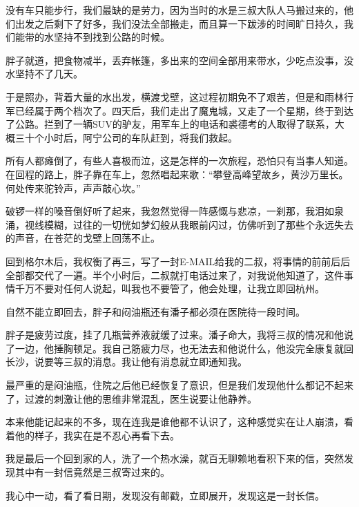 没有车只能步行，我们最缺的是劳力，因为当时的水是三叔大队人马搬过来的，他们出发之后剩下了好多，我们没法全部搬走，而且算一下跋涉的时间旷日持久，我们能带的水坚持不到找到公路的时候。

胖子就道，把食物减半，丢弃帐篷，多出来的空间全部用来带水，少吃点没事，没水坚持不了几天。

于是照办，背着大量的水出发，横渡戈壁，这过程初期免不了艰苦，但是和雨林行军已经属于两个档次了。四天后，我们走出了魔鬼城，又走了一个星期，终于到达了公路。拦到了一辆SUV的驴友，用军车上的电话和裘德考的人取得了联系，大概三十个小时后，阿宁公司的车队赶到，将我们救起。

所有人都瘫倒了，有些人喜极而泣，这是怎样的一次旅程，恐怕只有当事人知道。在回程的路上，胖子靠在车上，忽然唱起来歌：“攀登高峰望故乡，黄沙万里长。何处传来驼铃声，声声敲心坎。”

破锣一样的嗓音倒好听了起来，我忽然觉得一阵感慨与悲凉，一刹那，我泪如泉涌，视线模糊，过往的一切恍如梦幻般从我眼前闪过，仿佛听到了那些个永远失去的声音，在苍茫的戈壁上回荡不止。

回到格尔木后，我权衡了再三，写了一封E-MAIL给我的二叔，将事情的前前后后全部都交代了一遍。半个小时后，二叔就打电话过来了，对我说他知道了，这件事情千万不要对任何人说起，叫我也不要管了，他会处理，让我立即回杭州。

自然不能立即回去，胖子和闷油瓶还有潘子都必须在医院待一段时间。

胖子是疲劳过度，挂了几瓶营养液就缓了过来。潘子命大，我将三叔的情况和他说了一边，他捶胸顿足。我自己筋疲力尽，也无法去和他说什么，他没完全康复就回长沙，说要等三叔的消息。我让他有消息就立即通知我。

最严重的是闷油瓶，住院之后他已经恢复了意识，但是我们发现他什么都记不起来了，过渡的刺激让他的思维非常混乱，医生说要让他静养。

本来他能记起来的不多，现在连我是谁他都不认识了，这种感觉实在让人崩溃，看着他的样子，我实在是不忍心再看下去。

我是最后一个回到家的人，洗了一个热水澡，就百无聊赖地看积下来的信，突然发现其中有一封信竟然是三叔寄过来的。

我心中一动，看了看日期，发现没有邮戳，立即展开，发现这是一封长信。

